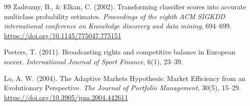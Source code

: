 \documentclass[pdflatex,sn-basic]{sn-jnl}
\begin{document}
\begin{thebibliography}{99}
Zadrozny, B., \& Elkan, C. (2002).
\newblock Transforming classifier scores into accurate multiclass probability estimates.
\newblock \emph{Proceedings of the eighth ACM SIGKDD international conference on Knowledge discovery and data mining}, 694--699. \url{https://doi.org/10.1145/775047.775151}

Peeters, T. (2011).
\newblock Broadcasting rights and competitive balance in European soccer.
\newblock \emph{International Journal of Sport Finance}, 6(1), 23--39.

Lo, A. W. (2004).
\newblock The Adaptive Markets Hypothesis: Market Efficiency from an Evolutionary Perspective.
\newblock \emph{The Journal of Portfolio Management}, 30(5), 15--29. \url{https://doi.org/10.3905/jpm.2004.442611}

\end{thebibliography}
\end{document}
